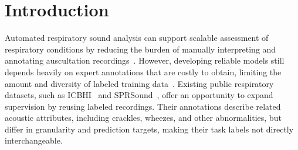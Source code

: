 \section{Introduction}
\label{sec:introduction}
Automated respiratory sound analysis can support scalable assessment of respiratory conditions by reducing the burden of manually interpreting and annotating auscultation recordings~\cite{hsu2021hflung,bae2023patchmix,kim2024sgscl,hou2023arsteth}.
However, developing reliable models still depends heavily on expert annotations that are costly to obtain, limiting the amount and diversity of labeled training data~\cite{zhang2024opera,gairola2021respirenet,niizumi2025m2dresp}.
Existing public respiratory datasets, such as ICBHI~\cite{rocha2019icbhi}
and SPRSound~\cite{zhang2022sprsound}, offer an opportunity to expand supervision by reusing labeled recordings. Their annotations describe related acoustic attributes, including crackles, wheezes, and other abnormalities, but differ in granularity and prediction targets, making their task labels not directly interchangeable.

